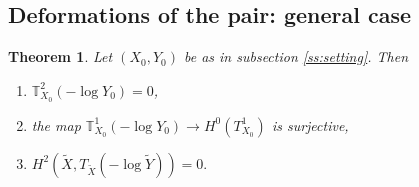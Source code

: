 \documentclass[11pt]{article}
\newtheorem{thm}{Theorem}[section]
\theoremstyle{definition}
\begin{document}
\subsection{Deformations of the pair: general case}
\begin{thm}\label{thm:unobstructedness}
  Let $(X_0,Y_0)$ be as in subsection \ref{ss:setting}. Then
  \begin{enumerate}
    \item $\mathbb{T}_{X_0}^2(-\log Y_0)=0$,
    \item the map $\mathbb{T}_{X_0}^1(-\log Y_0)\to H^0(T_{X_0}^1)$ is surjective,
    \item $H^2(\tilde{X}, T_{\tilde X}(-\log \tilde Y))=0.$
  \end{enumerate}
   
\end{thm}
\end{document}
